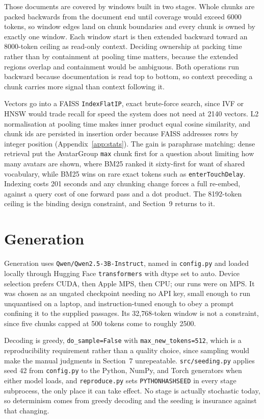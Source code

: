 \documentclass[10pt,a4paper]{article}
\begin{document}
Those documents are covered by windows built in two stages. Whole chunks are packed backwards from the document end until coverage would exceed 6000 tokens, so window edges land on chunk boundaries and every chunk is owned by exactly one window. Each window start is then extended backward toward an 8000-token ceiling as read-only context. Deciding ownership at packing time rather than by containment at pooling time matters, because the extended regions overlap and containment would be ambiguous. Both operations run backward because documentation is read top to bottom, so context preceding a chunk carries more signal than context following it.

Vectors go into a FAISS \texttt{IndexFlatIP}, exact brute-force search, since IVF or HNSW would trade recall for speed the system does not need at 2140 vectors. L2 normalisation at pooling time makes inner product equal cosine similarity, and chunk ids are persisted in insertion order because FAISS addresses rows by integer position (Appendix~\ref{app:stats}). The gain is paraphrase matching: dense retrieval put the AvatarGroup \texttt{max} chunk first for a question about limiting how many avatars are shown, where BM25 ranked it sixty-first for want of shared vocabulary, while BM25 wins on rare exact tokens such as \texttt{enterTouchDelay}. Indexing costs 201 seconds and any chunking change forces a full re-embed, against a query cost of one forward pass and a dot product. The 8192-token ceiling is the binding design constraint, and Section~9 returns to it.

\section{Generation}

Generation uses \texttt{Qwen/Qwen2.5-3B-Instruct}, named in \texttt{config.py} and loaded locally through Hugging Face \texttt{transformers} with dtype set to auto. Device selection prefers CUDA, then Apple MPS, then CPU; our runs were on MPS. It was chosen as an ungated checkpoint needing no API key, small enough to run unquantised on a laptop, and instruction-tuned enough to obey a prompt confining it to the supplied passages. Its 32{,}768-token window is not a constraint, since five chunks capped at 500 tokens come to roughly 2500.

Decoding is greedy, \texttt{do\_sample=False} with \texttt{max\_new\_tokens=512}, which is a reproducibility requirement rather than a quality choice, since sampling would make the manual judgments in Section~7 unrepeatable. \texttt{src/seeding.py} applies seed 42 from \texttt{config.py} to the Python, NumPy, and Torch generators when either model loads, and \texttt{reproduce.py} sets \texttt{PYTHONHASHSEED} in every stage subprocess, the only place it can take effect. No stage is actually stochastic today, so determinism comes from greedy decoding and the seeding is insurance against that changing.
\end{document}
